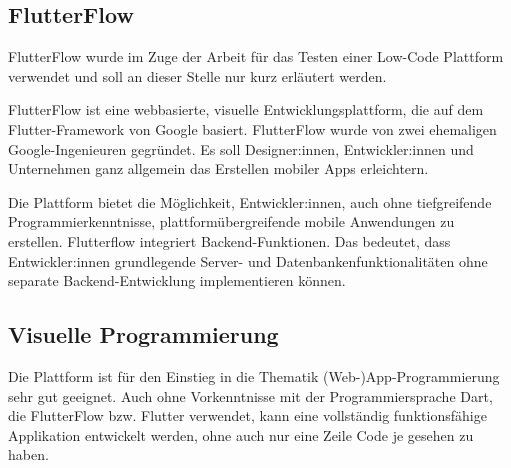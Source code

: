 \documentclass[acmtog, language=ngerman]{acmart}
\begin{document}
\subsection{FlutterFlow}
FlutterFlow wurde im Zuge der Arbeit für das Testen einer Low-Code Plattform verwendet und soll an dieser Stelle nur kurz erläutert werden.

FlutterFlow ist eine webbasierte, visuelle Entwicklungsplattform, die auf dem Flutter-Framework von Google basiert. FlutterFlow wurde von zwei ehemaligen Google-Ingenieuren gegründet. Es soll Designer:innen, Entwickler:innen und Unternehmen ganz allgemein das Erstellen mobiler Apps erleichtern.

Die Plattform bietet die Möglichkeit, Entwickler:innen, auch ohne tiefgreifende Programmierkenntnisse, plattformübergreifende mobile Anwendungen zu erstellen.
Flutterflow integriert Backend-Funktionen. Das bedeutet, dass Entwickler:innen grundlegende Server- und Datenbankenfunktionalitäten ohne separate Backend-Entwicklung implementieren können. \cite{flutterflow_features}

\subsection{Visuelle Programmierung}
Die Plattform ist für den Einstieg in die Thematik (Web-)App-Programmierung sehr gut geeignet. Auch ohne Vorkenntnisse mit der Programmiersprache Dart, die FlutterFlow bzw. Flutter verwendet, kann eine vollständig funktionsfähige Applikation entwickelt werden, ohne auch nur eine Zeile Code je gesehen zu haben.
\end{document}
